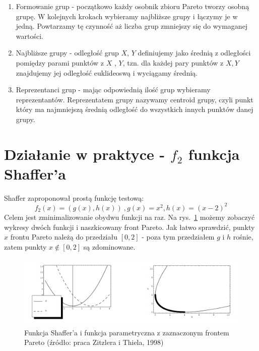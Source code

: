\documentclass[a4paper]{article}
\begin{document}
\begin{enumerate}
\item Formowanie grup - początkowo każdy osobnik zbioru Pareto tworzy osobną grupę. W kolejnych krokach wybieramy najbliższe grupy i łączymy je w jedną. Powtarzamy tę czynność aż liczba grup zmniejszy się do wymaganej wartości.
\item  Najbliższe grupy - odległość grup $X$, $Y$ definiujemy jako średnią z odległości pomiędzy parami punktów z $X$ , $Y$, tzn. dla każdej pary punktów z $X,Y$ znajdujemy jej odległość euklideoswą i wyciągamy średnią.
\item Reprezentanci grup - mając odpowiednią ilość grup wybieramy reprezentantów. Reprezentatem grupy nazywamy centroid grupy, czyli punkt który ma najmniejszą średnią odległość do wszystkich innych punktów danej grupy. 
\end{enumerate}
\section{Działanie w praktyce - $f_2$ funkcja Shaffer'a}
Shaffer zaproponował prostą funkcję testową: 
$$f_2(x) = (g(x), h(x)) \ , g(x) = x^2, h(x) = (x-2)^2$$
Celem jest zminimalizowanie obydwu funkcji na raz. Na rys.~\ref{fig:shaffer} możemy zobaczyć wykresy dwóch funkcji i naszkicowany front Pareto. Jak łatwo sprawdzić, punkty $x$ frontu Pareto należą do przedziału $[0,2]$ - poza tym przedziałem $g$ i $h$ rośnie, zatem punkty $x \notin [0,2]$ są zdominowane.
\begin{figure}[htbp]{}
\centerline{\includegraphics[scale=.35]{schaffers.png}}
\caption{Funkcja Shaffer'a i funkcja parametryczna z zaznaczonym frontem Pareto (źródło: praca Zitzlera i Thiela, 1998)}
\label{fig:shaffer}
\end{figure}
\end{document}
